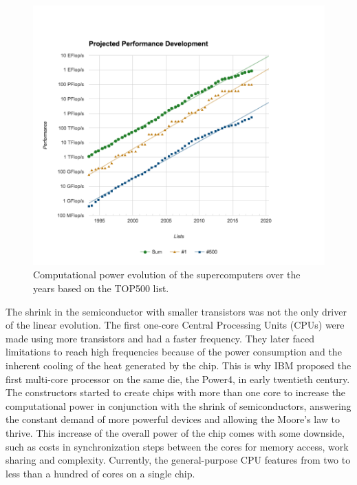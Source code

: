 \begin{figure}
\centering
\includegraphics[width=.85\linewidth]{figures/introduction/top500_list_approximation.png}
\caption[Evolution of computational power, the TOP500]{Computational power evolution of the supercomputers over the years based on the TOP500 list.}
\label{fig:intro_top500}
\end{figure}

The shrink in the semiconductor with smaller transistors was not the only driver of the linear evolution.
The first one-core Central Processing Units (CPUs) were made using more transistors and had a faster frequency.
They later faced limitations to reach high frequencies because of the power consumption and the inherent cooling of the heat generated by the chip.
This is why IBM proposed the first multi-core processor on the same die, the Power4, in early twentieth century.
The constructors started to create chips with more than one core to increase the computational power in conjunction with the shrink of semiconductors, answering the constant demand of more powerful devices and allowing the Moore's law to thrive. 
This increase of the overall power of the chip comes with some downside, such as costs in synchronization steps between the cores for memory access, work sharing and complexity.
Currently, the general-purpose CPU features from two to less than a hundred of cores on a single chip.\\

